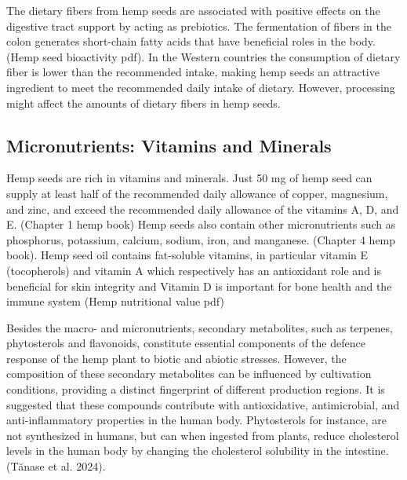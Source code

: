 \vspace{1em}
The dietary fibers from hemp seeds are associated with positive effects on the digestive tract support by acting as prebiotics. The fermentation of fibers in the colon generates short-chain fatty acids that have beneficial roles in the body. (Hemp seed bioactivity pdf). In the Western countries the consumption of dietary fiber is lower than the recommended intake, making hemp seeds an attractive ingredient to meet the recommended daily intake of dietary. However, processing might affect the amounts of dietary fibers in hemp seeds. 

\subsection{Micronutrients: Vitamins and Minerals}
Hemp seeds are rich in vitamins and minerals. Just 50 mg of hemp seed can supply at least half of the recommended daily allowance of copper, magnesium, and zinc, and exceed the recommended daily allowance of the vitamins A, D, and E. (Chapter 1 hemp book) Hemp seeds also contain other micronutrients such as phosphorus, potassium, calcium, sodium, iron, and manganese. (Chapter 4 hemp book). Hemp seed oil contains fat-soluble vitamins, in particular vitamin E (tocopherols) and vitamin A which respectively has an antioxidant role and is beneficial for skin integrity and Vitamin D is important for bone health and the immune system (Hemp nutritional value pdf)

\vspace{1em}
Besides the macro- and micronutrients, secondary metabolites, such as terpenes, phytosterols and flavonoids, constitute essential components of the defence response of the hemp plant to biotic and abiotic stresses. However, the composition of these secondary metabolites can be influenced by cultivation conditions, providing a distinct fingerprint of different production regions. It is suggested that these compounds contribute with antioxidative, antimicrobial, and anti-inflammatory properties in the human body. Phytosterols for instance, are not synthesized in humans, but can when ingested from plants, reduce cholesterol levels in the human body by changing the cholesterol solubility in the intestine. (Tănase et al. 2024).

